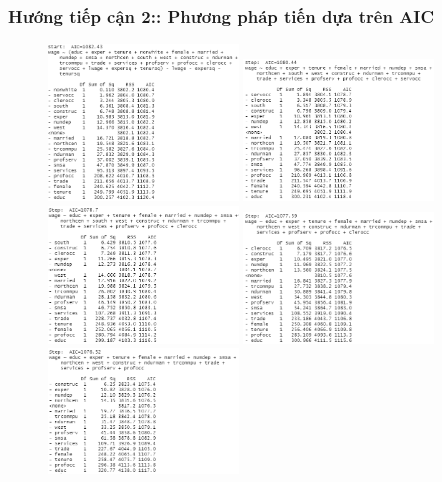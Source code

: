\subsubsection*{Hướng tiếp cận 2:: Phương pháp tiến dựa trên AIC}
\begin{figure}[H]
	\includegraphics[width=0.45\textwidth]{../Photo Of Result/stepAIC(4)-1}
	\includegraphics[width=0.45\textwidth]{../Photo Of Result/stepAIC(4)-2}
	\includegraphics[width=0.45\textwidth]{../Photo Of Result/stepAIC(4)-3}
	\includegraphics[width=0.45\textwidth]{../Photo Of Result/stepAIC(4)-4}
	\includegraphics[width=0.45\textwidth]{../Photo Of Result/stepAIC(4)-5}

\end{figure}
